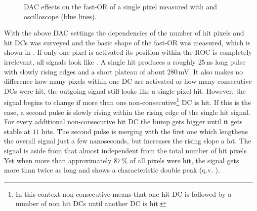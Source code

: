 \documentclass[british,11pt,a4paper]{memoir}
\begin{document}
\begin{figure}[ht]
	\centering
	\hfill
	\caption{\ac{DAC} effects on the fast-OR of a single pixel measured with and oscilloscope (blue lines).}
	\label{pfastor}
\end{figure}\no
With the above \ac{DAC} settings the dependencies of the number of hit pixels and hit \ac{DC}s was surveyed and the basic shape of the fast-OR was measured, which is shown in . If only one pixel is activated its position within the \ac{ROC} is completely irrelevant, all signals look like . A single hit produces a roughly $25\,$ns long pulse with slowly rising edges and a short plateau of about $280\,$mV. It also makes no difference how many pixels within one \ac{DC} are activated or how many consecutive \ac{DC}s were hit, the outgoing signal still looks like a single pixel hit. However, the signal begins to change if more than one non-consecutive\footnote{In this context non-consecutive means that one hit \ac{DC} is followed by a number of non hit \ac{DC}s until another \ac{DC} is hit.} \ac{DC} is hit. If this is the case, a second pulse is slowly rising within the rising edge of the single hit signal. For every additional non-consecutive hit \ac{DC} the bump gets bigger until it gets stable at $11$ hits. The second pulse is merging with the first one which lengthens the overall signal just a few nanoseconds, but increases the rising slope a lot. The signal is aside from that almost independent from the total number of hit pixels Yet when more than approximately $87\,$\% of all pixels were hit, the signal gets more than twice as long and shows a characteristic double peak (q.v. ).\\
\end{document}
